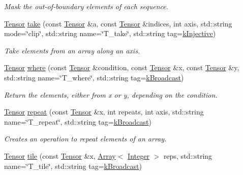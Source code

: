 \begin{DoxyCompactItemize}
\begin{DoxyCompactList}\small\item\em Mask the out-\/of-\/boundary elements of each sequence. \end{DoxyCompactList}\item 
\hyperlink{classtvm_1_1te_1_1Tensor}{Tensor} \hyperlink{namespacetopi_a94bc3bef1d14c142405d7a3b29ec1657}{take} (const \hyperlink{classtvm_1_1te_1_1Tensor}{Tensor} \&a, const \hyperlink{classtvm_1_1te_1_1Tensor}{Tensor} \&indices, int axis, std\+::string mode=\char`\"{}clip\char`\"{}, std\+::string name=\char`\"{}T\+\_\+take\char`\"{}, std\+::string tag=\hyperlink{namespacetopi_a60f05ec416e4618d25ad00dd9f536934}{k\+Injective})
\begin{DoxyCompactList}\small\item\em Take elements from an array along an axis. \end{DoxyCompactList}\item 
\hyperlink{classtvm_1_1te_1_1Tensor}{Tensor} \hyperlink{namespacetopi_a79f6a17e39e9f5cc3ec1f2e74bde3917}{where} (const \hyperlink{classtvm_1_1te_1_1Tensor}{Tensor} \&condition, const \hyperlink{classtvm_1_1te_1_1Tensor}{Tensor} \&x, const \hyperlink{classtvm_1_1te_1_1Tensor}{Tensor} \&y, std\+::string name=\char`\"{}T\+\_\+where\char`\"{}, std\+::string tag=\hyperlink{namespacetopi_a794b9155e9ba9d1c9c42a1cff1fb645f}{k\+Broadcast})
\begin{DoxyCompactList}\small\item\em Return the elements, either from x or y, depending on the condition. \end{DoxyCompactList}\item 
\hyperlink{classtvm_1_1te_1_1Tensor}{Tensor} \hyperlink{namespacetopi_ad9915152471ce419d2f28e17c765b2d2}{repeat} (const \hyperlink{classtvm_1_1te_1_1Tensor}{Tensor} \&x, int repeats, int axis, std\+::string name=\char`\"{}T\+\_\+repeat\char`\"{}, std\+::string tag=\hyperlink{namespacetopi_a794b9155e9ba9d1c9c42a1cff1fb645f}{k\+Broadcast})
\begin{DoxyCompactList}\small\item\em Creates an operation to repeat elements of an array. \end{DoxyCompactList}\item 
\hyperlink{classtvm_1_1te_1_1Tensor}{Tensor} \hyperlink{namespacetopi_ad9f589bd3dd30f423e09fc66bff4f5c2}{tile} (const \hyperlink{classtvm_1_1te_1_1Tensor}{Tensor} \&x, \hyperlink{classtvm_1_1Array}{Array}$<$ \hyperlink{classtvm_1_1Integer}{Integer} $>$ reps, std\+::string name=\char`\"{}T\+\_\+tile\char`\"{}, std\+::string tag=\hyperlink{namespacetopi_a794b9155e9ba9d1c9c42a1cff1fb645f}{k\+Broadcast})

\end{DoxyCompactItemize}
